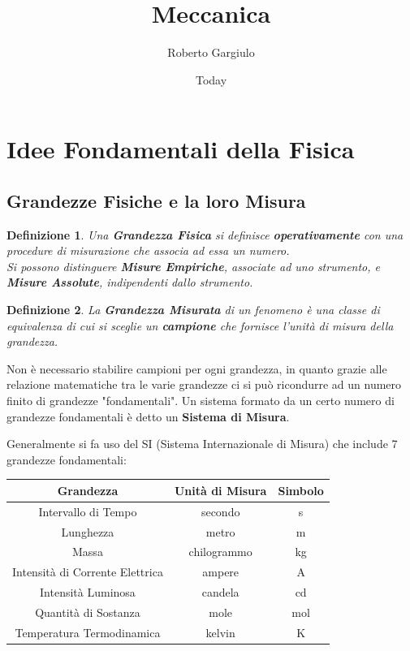 \documentclass{article}
\title{Meccanica}
\author{Roberto Gargiulo}
\date{Today}
\newtheorem{defn}{Definizione}[section]
\newcommand{\note}{\noindent {\quad \bf \underline{Osservazione:}} \quad}
\begin{document}
\maketitle
\tableofcontents
\pagebreak


\section{Idee Fondamentali della Fisica}

\subsection{Grandezze Fisiche e la loro Misura}

\begin{defn}
Una \textbf{Grandezza Fisica} si definisce \textbf{operativamente} con una procedure di misurazione che associa ad essa un numero. \\
Si possono distinguere \textbf{Misure Empiriche}, associate ad uno strumento, e \textbf{Misure Assolute}, indipendenti dallo strumento. 
\end{defn}

\begin{defn}
La \textbf{Grandezza Misurata} di un fenomeno è una classe di equivalenza di cui si sceglie un \textbf{campione} che fornisce l'unità di misura della grandezza.
\end{defn}
\note Non è necessario stabilire campioni per ogni grandezza, in quanto grazie alle relazione matematiche tra le varie grandezze ci si può ricondurre ad un numero finito di grandezze "fondamentali". Un sistema formato da un certo numero di grandezze fondamentali è detto un \textbf{Sistema di Misura}.

Generalmente si fa uso del SI (Sistema Internazionale di Misura) che include 7 grandezze fondamentali:
\begin{center}
\begin{tabular}{ |c|c|c| }
\hline
Grandezza & Unità di Misura & Simbolo\\
\hline
Intervallo di Tempo & secondo & s\\
Lunghezza & metro & m\\
Massa & chilogrammo	& kg\\
Intensità di Corrente Elettrica	& ampere & A\\
Intensità Luminosa	& candela &	cd\\
Quantità di Sostanza & mole & mol\\
Temperatura Termodinamica &	kelvin & K\\
\hline
\end{tabular}
\end{center}
\end{document}

